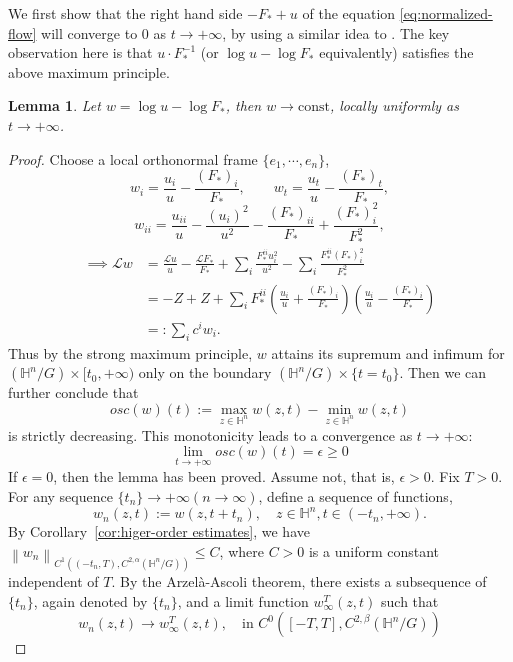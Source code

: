 \documentclass[reqno]{amsart}
\newtheorem{lemma}[theorem]{Lemma}
\theoremstyle{remark}
\newcommand{\norm}[1]{\left\lVert{#1}\right\rVert}
\renewcommand{\H}{{\mathbb{H}}}
\theoremstyle{definition}
\numberwithin{equation}{section}
\begin{document}
We first show that the right hand side \( -F_* + u\) of the equation \eqref{eq:normalized-flow} will converge to \(0\) as \(t\to +\infty\), by using a similar idea to \cite{Huang2021}. The key observation here is that \(u\cdot F_*^{-1}\) (or \(\log u - \log F_*\) equivalently) satisfies the above maximum principle. 
\begin{lemma}\label{lem:logu-logF}
    Let \(w = \log u - \log F_*\), then \(w \to \text{const}\), locally uniformly as \(t\to +\infty\). 
\end{lemma}
\begin{proof}
    Choose a local orthonormal frame \(\{e_1,\cdots,e_n\}\), 
    \[ w_i = \frac{u_i}{u} - \frac{(F_*)_i}{F_*}, \qquad w_t = \frac{u_t}{u} - \frac{(F_*)_t}{F_*}, \]
    \[ w_{ii} = \frac{u_{ii}}{u} - \frac{(u_i)^2}{u^2} - \frac{(F_*)_{ii}}{F_*} + \frac{(F_*)_i^2}{F_*^2}, \]
    \begin{equation}\label{eq:eq-for-w}
        \begin{aligned}
        \implies  \mathscr{L}w &= \frac{\mathscr{L}u}{u} -\frac{\mathscr{L}{F_*}}{F_*} + \sum_i \frac{F_*^{ii}u_i^2}{u^2} - \sum_i \frac{F_*^{ii}(F_*)_i^2}{F_*^2}\\
        &= -Z + Z + \sum_i F_*^{ii} \left( \frac{u_i}{u} +\frac{(F_*)_i}{F_*}\right) \left( \frac{u_i}{u} - \frac{(F_*)_i}{F_*} \right) \\
        &=: \sum_i c^i w_i.
        \end{aligned} 
    \end{equation}
    Thus by the strong maximum principle, \(w\) attains its supremum and infimum for \((\H^n / G) \times [t_0,+\infty)\) only on the boundary \((\H^n / G) \times \{t=t_0\}\). Then we can further conclude that 
    \[ osc(w)(t) := \max_{z\in \H^n}w(z,t) - \min_{z\in \H^n}w(z,t) \]
    is strictly decreasing. This monotonicity leads to a convergence as \(t\to +\infty\):
    \[ \lim_{t\to +\infty} osc(w)(t) = \epsilon \geq 0 \]
    If \(\epsilon = 0\), then the lemma has been proved. Assume not, that is, \(\epsilon > 0\). Fix \(T > 0\). For any sequence \(\{t_n\}\to +\infty (n\to \infty)\), define a sequence of functions,  
    \[ w_n(z,t) := w(z,t+t_n), \quad z\in \H^n, t\in (-t_n,+\infty). \]
    By Corollary~\ref{cor:higer-order estimates}, we have 
    \(\norm{w_n}_{C^1((-t_n,T), C^{2,\alpha}(\H^n / G))}\leq C\), where \(C>0\) is a uniform constant independent of \(T\). By the Arzelà-Ascoli theorem, there exists a subsequence of \(\{t_n\}\), again denoted by \(\{t_n\}\), and a limit function \(w_{\infty}^{T}(z,t)\) such that 
    \[ w_n(z,t) \to w_{\infty}^{T}(z,t), \quad \text{in }C^0\left([-T,T],C^{2,\beta}(\H^n / G)\right) \]

\end{proof}
\end{document}
